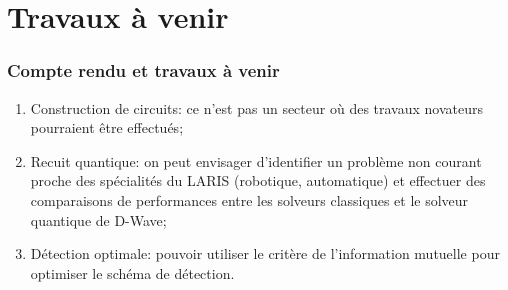 \documentclass{beamer}
\begin{document}
\section{Travaux à venir}
\begin{frame}
    \frametitle{Compte rendu et travaux à venir}

    \begin{enumerate}
        \item Construction de circuits: ce n'est pas un secteur où des travaux novateurs pourraient être effectués;
        \item Recuit quantique: on peut envisager d'identifier un problème non courant proche des spécialités du LARIS (robotique, automatique) et effectuer des comparaisons de performances entre les solveurs classiques et le solveur quantique de D-Wave;
        \item Détection optimale: pouvoir utiliser le critère de l'information mutuelle pour optimiser le schéma de détection.
    \end{enumerate}
\end{frame}
\end{document}
